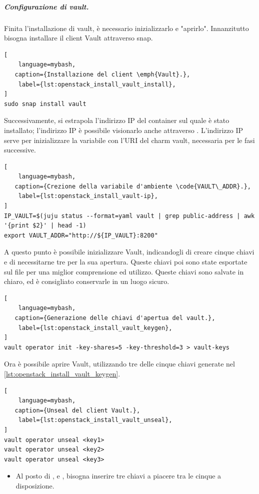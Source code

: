 \subparagraph{Configurazione di vault.}\label{subpar:vault_configuration}
Finita l'installazione di vault, è necessario inizializzarlo e "aprirlo".
% 
Innanzitutto bisogna installare il client Vault attraverso snap.
\begin{lstlisting}[
    language=mybash, 
   caption={Installazione del client \emph{Vault}.},
    label={lst:openstack_install_vault_install},
]
sudo snap install vault
\end{lstlisting}

\bigskip\noindent
Successivamente, si estrapola l'indirizzo IP del container sul quale è stato installato; 
% 
l'indirizzo IP è possibile visionarlo anche attraverso .
% 
L'indirizzo IP serve per inizializzare la variabile  con l'URI del charm vault, necessaria per le fasi successive.
\begin{lstlisting}[
    language=mybash, 
   caption={Crezione della variabile d'ambiente \code{VAULT\_ADDR}.},
    label={lst:openstack_install_vault-ip},
]
IP_VAULT=$(juju status --format=yaml vault | grep public-address | awk '{print $2}' | head -1)
export VAULT_ADDR="http://${IP_VAULT}:8200"
\end{lstlisting}

\bigskip\noindent
A questo punto è possibile inizializzare Vault, indicandogli di creare cinque chiavi e di necessitarne tre per la sua apertura.
% 
Queste chiavi poi sono state esportate sul file  per una miglior comprensione ed utilizzo.
% 
Queste chiavi sono salvate in chiaro, ed è consigliato conservarle in un luogo sicuro.
\begin{lstlisting}[
    language=mybash, 
   caption={Generazione delle chiavi d'apertua del vault.},
    label={lst:openstack_install_vault_keygen},
]
vault operator init -key-shares=5 -key-threshold=3 > vault-keys
\end{lstlisting}

\bigskip\noindent
Ora è possibile aprire Vault, utilizzando tre delle cinque chiavi generate nel \cref{lst:openstack_install_vault_keygen}.
\begin{lstlisting}[
    language=mybash, 
   caption={Unseal del client Vault.},
    label={lst:openstack_install_vault_unseal},
]
vault operator unseal <key1>
vault operator unseal <key2>
vault operator unseal <key3>
\end{lstlisting}
\begin{itemize}
    \item Al posto di ,  e , bisogna inserire tre chiavi a piacere tra le cinque a disposizione. 
\end{itemize}


